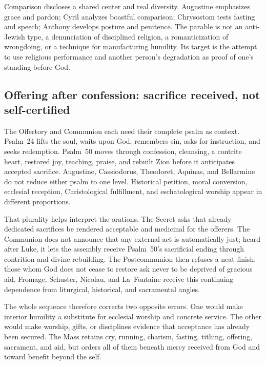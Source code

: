 Comparison discloses a shared center and real diversity. Augustine emphasizes
grace and pardon; Cyril analyzes boastful comparison; Chrysostom tests fasting
and speech; Anthony develops posture and penitence. The parable is not
an anti-Jewish type, a denunciation of disciplined religion, a
romanticization of wrongdoing, or a technique for manufacturing humility. Its target is the attempt to use religious performance and another
person's degradation as proof of one's standing before God.

\subsection*{Offering after confession: sacrifice received, not self-certified\enspace{}}

The Offertory and Communion each need their complete psalm as context. Psalm~24 lifts the soul, waits upon God, remembers sin, asks for
instruction, and seeks redemption. Psalm~50 moves through confession,
cleansing, a contrite heart, restored joy, teaching, praise, and rebuilt Zion
before it anticipates accepted sacrifice. Augustine, Cassiodorus, Theodoret,
Aquinas, and Bellarmine do not reduce either psalm to one level. Historical
petition, moral conversion, ecclesial reception, Christological fulfillment,
and eschatological worship appear in different proportions.

That plurality helps interpret the orations. The Secret asks that already
dedicated sacrifices be rendered acceptable and medicinal for the offerers.
The Communion does not announce that any external act is automatically just;
heard after Luke, it lets the assembly receive Psalm~50's sacrificial ending
through contrition and divine rebuilding. The Postcommunion then refuses a
neat finish: those whom God does not cease to restore ask never to be deprived
of gracious aid. Fromage, Schuster, Nicolau, and La~Fontaine receive this
continuing dependence from liturgical, historical, and sacramental angles.

The whole sequence therefore corrects two opposite errors. One would make
interior humility a substitute for ecclesial worship and concrete service.
The other would make worship, gifts, or disciplines evidence that acceptance
has already been secured. The Mass retains cry, running, charism, fasting,
tithing, offering, sacrament, and aid, but orders all of them beneath mercy
received from God and toward benefit beyond the self.

